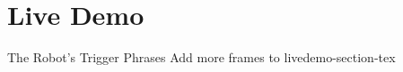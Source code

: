 \section{Live Demo}
    
    \frame{\sectionpage}
    
    \begin{frame}{The Robot's Trigger Phrases}
         \centering
         \huge{Add more frames to livedemo-section-tex}
    \end{frame}